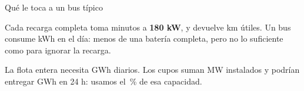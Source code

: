 \documentclass[aspectratio=169,11pt]{beamer}
\begin{document}
\begin{frame}{Qué le toca a un bus típico}
  \vspace{4pt}
  \hfill
  \hfill

  \vspace{16pt}
  \small
  Cada recarga completa toma \tiempoRecarga{} minutos a
  \textbf{180 kW}, y devuelve \autonomiaUtil{} km útiles.
  Un bus consume \energiaPorBus{} kWh en el día: menos de una batería
  completa, pero no lo suficiente como para ignorar la recarga.

  \vspace{6pt}
  La flota entera necesita \energiaImplicita{} GWh diarios. Los
  \cuposTotales{} cupos suman \potenciaInstalada{} MW instalados y podrían
  entregar \capacidadCargaDia{} GWh en 24 h: usamos el
  \usoCapacidadCarga\,\% de esa capacidad.

\end{frame}
\end{document}
